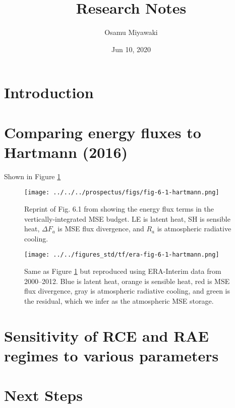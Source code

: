 \documentclass[11pt]{article}
\author{Osamu Miyawaki}
\date{Jun 10, 2020}
\title{Research Notes}
\begin{document}
\maketitle

\section{Introduction}
\label{sec:orga958d81}

\section{Comparing energy fluxes to Hartmann (2016)}
\label{sec:orgc6a99bb}

Shown in Figure \ref{fig:orgfcea42b}

\begin{figure}[htbp]
\centering
\texttt{[image: ../../../prospectus/figs/fig-6-1-hartmann.png]}
\caption{\label{fig:orgfcea42b}Reprint of Fig. 6.1 from \cite{hartmann_important_2002} showing the energy flux terms in the vertically-integrated MSE budget. LE is latent heat, SH is sensible heat, \(\Delta F_a\) is MSE flux divergence, and \(R_a\) is atmospheric radiative cooling.}
\end{figure}

\begin{figure}[htbp]
\centering
\texttt{[image: ../../figures\_std/tf/era-fig-6-1-hartmann.png]}
\caption{\label{fig:orgd5a751b}Same as Figure \ref{fig:orgfcea42b} but reproduced using ERA-Interim data from 2000--2012. Blue is latent heat, orange is sensible heat, red is MSE flux divergence, gray is atmospheric radiative cooling, and green is the residual, which we infer as the atmospheric MSE storage.}
\end{figure}

\section{Sensitivity of RCE and RAE regimes to various parameters}
\label{sec:org6a7a86b}

\section{Next Steps}
\label{sec:org94035b8}



\end{document}
